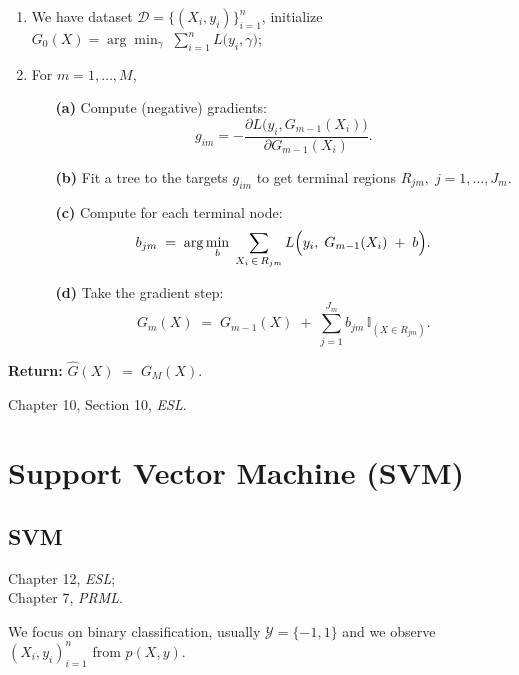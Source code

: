\documentclass[12pt]{book}
\theoremstyle{definition}
\theoremstyle{remark}
\begin{document}
\begin{enumerate}
    \item We have dataset $\displaystyle \mathcal{D} = \bigl\{(X_i, y_i)\bigr\}_{i=1}^n$, initialize $G_0(X) = \arg\min_{\gamma}\; \sum_{i=1}^n L\bigl(y_i,\gamma\bigr)$;
    \item For $m = 1,\dots,M$,
    \begin{enumerate}
        \item[\textbf{(a)}] Compute (negative) gradients:\\
        \[
        g_{im} = -\frac{\partial L\bigl(y_i,G_{m-1}(X_i)\bigr)}{\partial G_{m-1}(X_i)}.
        \]

        \item[\textbf{(b)}] Fit a tree to the targets $g_{im}$ to get terminal regions $R_{jm},\;j = 1,\dots,J_m$.

        \item[\textbf{(c)}] Compute for each terminal node:\\
        \[
        b_{jm} 
        \;=\;\arg\min_{b}\;\sum_{X_i \,\in\, R_{jm}} 
        L\Bigl(y_i,\;G_{m-1}(X_i)\;+\;b\Bigr).
        \]

        \item[\textbf{(d)}] Take the gradient step:\\
        \[
        G_m(X) 
        \;=\; G_{m-1}(X)\;+\;\sum_{j=1}^{J_m} b_{jm}\,\mathbb{I}_{(X \in R_{jm})}.
        \]
    \end{enumerate}
\end{enumerate}

\noindent
\textbf{Return:} $\displaystyle \hat{G}(X) \;=\; G_M(X).$


\begin{referencebox}
    Chapter 10, Section 10, \textit{ESL}.
\end{referencebox}


\newpage
\section{Support Vector Machine (SVM)}
\subsection{SVM}
\begin{referencebox}
    Chapter 12, \textit{ESL};\\
    Chapter 7, \textit{PRML}.
\end{referencebox}
We focus on binary classification, usually $\mathcal{Y} = \{-1,1\}$ and we observe $(X_i,y_i)_{i=1}^n$ from $p(X,y)$.
\end{document}
